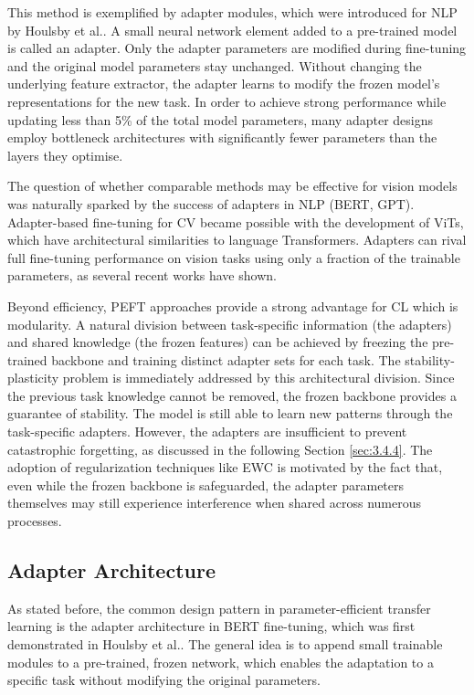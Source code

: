 \documentclass[english, LaM, oneside]{sapthesis}%
\numberwithin{equation}{chapter}
\begin{document}
This method is exemplified by adapter modules, which were introduced for NLP by Houlsby et al.\cite{15}. A small neural network element added to a pre-trained model is called an adapter. Only the adapter parameters are modified during fine-tuning and the original model parameters stay unchanged. Without changing the underlying feature extractor, the adapter learns to modify the frozen model's representations for the new task. In order to achieve strong performance while updating less than 5\% of the total model parameters, many adapter designs employ bottleneck architectures with significantly fewer parameters than the layers they optimise.

The question of whether comparable methods may be effective for vision models was naturally sparked by the success of adapters in NLP (BERT, GPT)\cite{15}\cite{28}. Adapter-based fine-tuning for CV became possible with the development of ViTs, which have architectural similarities to language Transformers. Adapters can rival full fine-tuning performance on vision tasks using only a fraction of the trainable parameters, as several recent works \cite{32}\cite{chen2023visiontransformeradapterdense}\cite{visualprompttuning} have shown.

Beyond efficiency, PEFT approaches provide a strong advantage for CL which is modularity. A natural division between task-specific information (the adapters) and shared knowledge (the frozen features) can be achieved by freezing the pre-trained backbone and training distinct adapter sets for each task. The stability-plasticity problem is immediately addressed by this architectural division. Since the previous task knowledge cannot be removed, the frozen backbone provides a guarantee of stability. The model is still able to learn new patterns through the task-specific adapters. However, the adapters are insufficient to prevent catastrophic forgetting, as discussed in the following Section \ref{sec:3.4.4}. The adoption of regularization techniques like EWC is motivated by the fact that, even while the frozen backbone is safeguarded, the adapter parameters themselves may still experience interference when shared across numerous processes.

\subsection{Adapter Architecture}
As stated before, the common design pattern in parameter-efficient transfer learning is the adapter architecture in BERT fine-tuning, which was first demonstrated in Houlsby et al.\cite{15}. The general idea is to append small trainable modules to a pre-trained, frozen network, which enables the adaptation to a specific task without modifying the original parameters.
\end{document}
